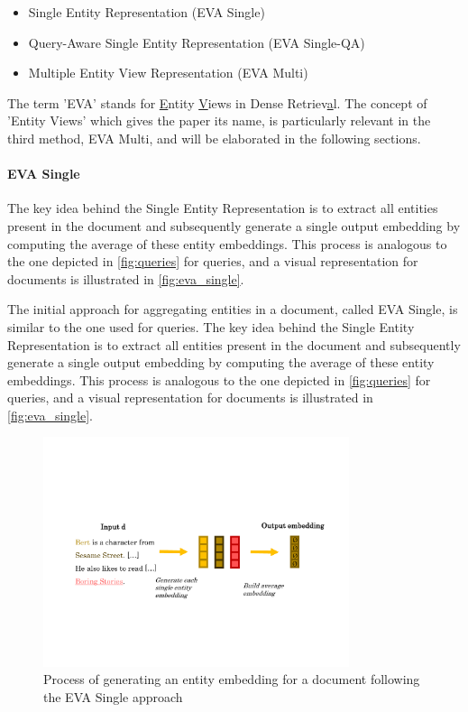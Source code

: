 \begin{itemize}
    \item Single Entity Representation (EVA Single)
    \item Query-Aware Single Entity Representation (EVA Single-QA)
    \item Multiple Entity View Representation (EVA Multi)
\end{itemize}

The term 'EVA' stands for \underline{E}ntity \underline{V}iews in Dense Retriev\underline{a}l. The concept of 'Entity Views' which gives the paper its name, is particularly relevant in the third method, EVA Multi, and will be elaborated in the following sections.

\paragraph*{EVA Single}

 The key idea behind the Single Entity Representation is to extract all entities present in the document and subsequently generate a single output embedding by computing the average of these entity embeddings. This process is analogous to the one depicted in \autoref{fig:queries} for queries, and a visual representation for documents is illustrated in \autoref{fig:eva_single}.

The initial approach for aggregating entities in a document, called EVA Single, is similar to the one used for queries. The key idea behind the Single Entity Representation is to extract all entities present in the document and subsequently generate a single output embedding by computing the average of these entity embeddings. This process is analogous to the one depicted in \autoref{fig:queries} for queries, and a visual representation for documents is illustrated in \autoref{fig:eva_single}.

\begin{figure}[!htb]
    \centering
    \includegraphics[trim={2cm 5cm 1.5cm 6cm}, clip, width=0.8\textwidth]{resources/eva_single} 
    \caption{Process of generating an entity embedding for a document following the EVA Single approach}
    \label{fig:eva_single}
\end{figure}

